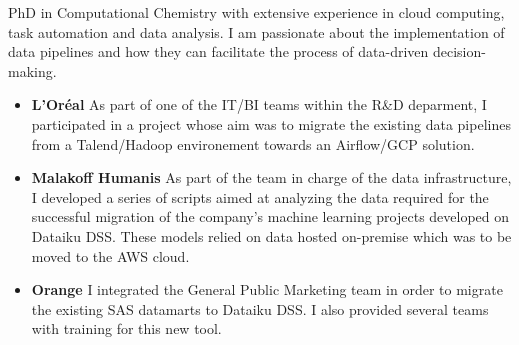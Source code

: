 \documentclass[10pt,a4paper,ragged2e,academicons]{altacv}
\begin{document}

\begin{fullwidth}
\makecvheader
\parbox{.7\paperwidth}{%
PhD in Computational Chemistry with extensive experience in cloud computing, task automation and data analysis. I am passionate about the implementation of data pipelines and how they can facilitate the process of data-driven decision-making.
}

\end{fullwidth}



\begin{itemize}
\item \textbf{L'Oréal} As part of one of the IT/BI teams within the R\&D deparment, I participated in a project whose aim was to migrate the existing data pipelines from a Talend/Hadoop environement towards an Airflow/GCP solution.
\end{itemize}

\divider

\begin{itemize}
\item \textbf{Malakoff Humanis} As part of the team in charge of the data infrastructure, I developed a series of scripts aimed at analyzing the data required for the successful migration of the company's machine learning projects developed on Dataiku DSS. These models relied on data hosted on-premise which was to be moved to the AWS cloud. 
\item \textbf{Orange} I integrated the General Public Marketing team in order to migrate the existing SAS datamarts to Dataiku DSS. I also provided several teams with training for this new tool. 
\end{itemize}
\end{document}
